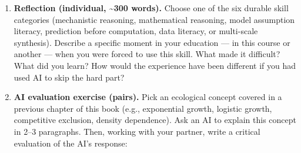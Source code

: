 \documentclass[
  letterpaper,
  DIV=11,
  numbers=noendperiod]{scrreprt}
\begin{document}
\begin{enumerate}
\def\labelenumi{\arabic{enumi}.}
\item
  \textbf{Reflection (individual, \textasciitilde300 words).} Choose one
  of the six durable skill categories (mechanistic reasoning,
  mathematical reasoning, model assumption literacy, prediction before
  computation, data literacy, or multi-scale synthesis). Describe a
  specific moment in your education --- in this course or another ---
  when you were forced to use this skill. What made it difficult? What
  did you learn? How would the experience have been different if you had
  used AI to skip the hard part?
\item
  \textbf{AI evaluation exercise (pairs).} Pick an ecological concept
  covered in a previous chapter of this book (e.g., exponential growth,
  logistic growth, competitive exclusion, density dependence). Ask an AI
  to explain this concept in 2--3 paragraphs. Then, working with your
  partner, write a critical evaluation of the AI's response:


\end{enumerate}
\end{document}
